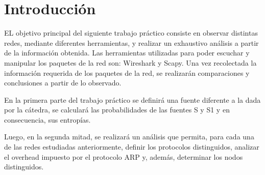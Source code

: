 \section{Introducción}
EL objetivo principal del siguiente trabajo práctico consiste en observar distintas redes, mediante diferentes herramientas, y realizar un exhaustivo análisis a partir de la información obtenida. Las herramientas utilizadas para poder escuchar y manipular los paquetes de la red son: Wireshark y Scapy. Una vez recolectada la información requerida de los paquetes de la red, se realizarán comparaciones y conclusiones a partir de lo observado. 

En la primera parte del trabajo práctico se definirá una fuente diferente a la dada por la cátedra, se calculará las probabilidades de las fuentes S y S1 y en consecuencia, sus entropías. 

Luego, en la segunda mitad, se realizará un análisis que permita, para cada una de las redes estudiadas anteriormente, definir los protocolos distinguidos, analizar el overhead impuesto por el protocolo ARP y, además, determinar los nodos distinguidos. 

